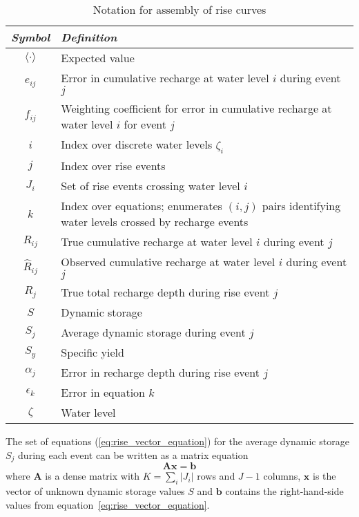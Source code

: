 \documentclass[11pt,a4paper]{article}
\renewcommand{\vec}[1]{\mathbf{#1}}
\begin{document}
\begin{table}[b!]
  \centering
  \begin{tabular}{cp{10.8cm}}
    \emph{Symbol} & \emph{Definition} \\
    \hline
    $\langle\cdot\rangle$ & Expected value \\
    $e_{ij}$ & Error in cumulative recharge at water level $i$ during event $j$ \\
    $f_{ij}$ & Weighting coefficient for error in cumulative recharge
               at water level $i$ for event $j$\\
    $i$ & Index over discrete water levels $\zeta_i$\\
    $j$ & Index over rise events\\
    $J_i$ & Set of rise events crossing water level $i$\\
    $k$ & Index over equations; enumerates $(i, j)$ pairs identifying water levels crossed by recharge events \\
    $R_{ij}$ & True cumulative recharge at water level $i$ during event $j$ \\
    $\widehat{R}_{ij}$ & Observed cumulative recharge at water level $i$ during event $j$ \\
    $R_j$ & True total recharge depth during rise event $j$ \\
    $S$ & Dynamic storage \\
    $S_j$ & Average dynamic storage during event $j$ \\
    $S_y$ & Specific yield \\
    $\alpha_j$ & Error in recharge depth during rise event $j$ \\
    $\epsilon_k$ & Error in equation $k$ \\
    $\zeta$ & Water level \\
  \end{tabular}
  \caption{Notation for assembly of rise curves}
  \label{tab:rise_notation}
\end{table}

The set of equations (\ref{eq:rise_vector_equation}) for the average
dynamic storage $S_j$ during each event can be written as a matrix
equation
\begin{equation}
  \vec{A}\vec{x} = \vec{b}
\end{equation}
where $\vec{A}$ is a dense matrix with $K = \sum_i |J_i|$ rows and $J - 1$
columns, $\vec{x}$ is the vector of unknown dynamic storage values $S$
and $\vec{b}$ contains the right-hand-side values from
equation~\ref{eq:rise_vector_equation}.
\end{document}
